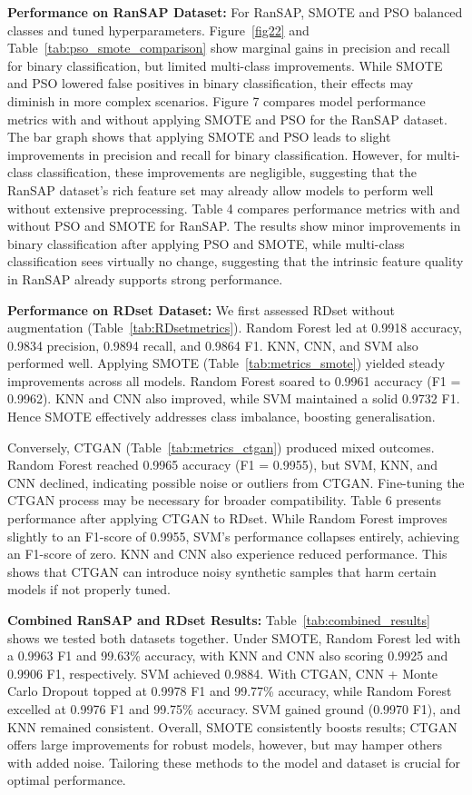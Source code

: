\textbf{Performance on RanSAP Dataset:}
 For RanSAP, SMOTE and PSO balanced classes and tuned hyperparameters. Figure~\ref{fig22} and Table~\ref{tab:pso_smote_comparison} show marginal gains in precision and recall for binary classification, but limited multi-class improvements. While SMOTE and PSO lowered false positives in binary classification, their effects may diminish in more complex scenarios. Figure 7 compares model performance metrics with and without applying SMOTE and PSO for the RanSAP dataset. The bar graph shows that applying SMOTE and PSO leads to slight improvements in precision and recall for binary classification. However, for multi-class classification, these improvements are negligible, suggesting that the RanSAP dataset’s rich feature set may already allow models to perform well without extensive preprocessing. Table 4 compares performance metrics with and without PSO and SMOTE for RanSAP. The results show minor improvements in binary classification after applying PSO and SMOTE, while multi-class classification sees virtually no change, suggesting that the intrinsic feature quality in RanSAP already supports strong performance.

\textbf{Performance on RDset Dataset:}
 We first assessed RDset without augmentation (Table~\ref{tab:RDsetmetrics}). Random Forest led at 0.9918 accuracy, 0.9834 precision, 0.9894 recall, and 0.9864 F1. KNN, CNN, and SVM also performed well. Applying SMOTE (Table~\ref{tab:metrics_smote}) yielded steady improvements across all models. Random Forest  soared to 0.9961 accuracy (F1 = 0.9962). KNN and CNN also  improved, while SVM maintained a solid 0.9732 F1. Hence SMOTE effectively addresses class imbalance, boosting generalisation.

 Conversely, CTGAN (Table~\ref{tab:metrics_ctgan}) produced mixed outcomes. Random Forest reached 0.9965 accuracy (F1 = 0.9955), but SVM, KNN, and CNN declined, indicating possible noise or outliers from CTGAN. Fine-tuning the CTGAN process may be necessary for broader compatibility. Table 6 presents performance after applying CTGAN to RDset. While Random Forest improves slightly to an F1-score of 0.9955, SVM’s performance collapses entirely, achieving an F1-score of zero. KNN and CNN also experience reduced performance. This shows that CTGAN can introduce noisy synthetic samples that harm certain models if not properly tuned.

\textbf{Combined RanSAP and RDset Results:} Table~\ref{tab:combined_results}  shows we tested both datasets together. Under SMOTE, Random Forest led with a 0.9963 F1 and 99.63\% accuracy, with KNN and CNN also scoring 0.9925 and 0.9906 F1, respectively. SVM achieved 0.9884. With CTGAN, CNN + Monte Carlo Dropout topped at 0.9978 F1 and 99.77\% accuracy, while Random Forest excelled at 0.9976 F1 and 99.75\% accuracy. SVM gained ground (0.9970 F1), and KNN remained consistent. Overall, SMOTE consistently boosts results; CTGAN offers large improvements for robust models, however, but may hamper others with added noise. Tailoring these methods to the model and dataset is crucial for optimal performance.

